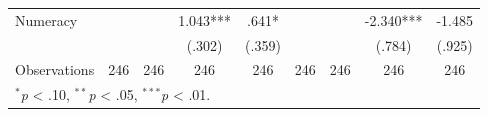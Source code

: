 \begin{tabular*}{\linewidth}{@{\extracolsep{\fill}}lcccccccc}
   Numeracy &  &  & \mbox{\hphantom{8}1.043***} & \mbox{\hphantom{88}.641*\hphantom{88}} &  &  & \mbox{-2.340***} & \mbox{-1.485\hphantom{888}}\\
    &  &  & \mbox{\hphantom{8}(.302)\hphantom{88}} & \mbox{\hphantom{8}(.359)\hphantom{88}} &  &  & \mbox{\hphantom{8}(.784)\hphantom{88}} & \mbox{\hphantom{8}(.925)\hphantom{88}}\\
   \midrule
   Observations & 246 & 246 & 246 & 246 & 246 & 246 & 246 & 246\\
   \multicolumn{9}{l}{\footnotesize $^{*}$\textit{p} < .10, $^{**}$\textit{p} < .05, $^{***}$\textit{p} < .01.}\\
   \bottomrule
\end{tabular*}
\par\endgroup
